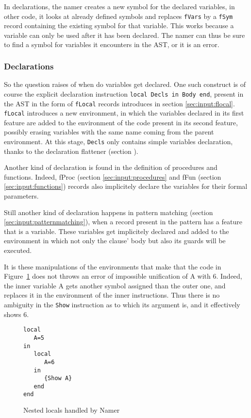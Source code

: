 \documentclass[a4paper]{memoir}
\begin{document}
In declarations, the namer creates a new symbol for the declared variables, in other code, it looks at already defined symbols and replaces \lstinline!fVars! by a \lstinline!fSym! record containing the existing symbol for that variable. This works because a variable can only be used after it has been declared. The namer can thus be sure to find a symbol for variables it encounters in the AST, or it is an error.

\subsubsection{Declarations}
So the question raises of when do variables get declared.
One such construct is of course the explicit declaration instruction \lstinline!local Decls in Body end!, present in the AST in the form of \lstinline!fLocal! records introduces in section \ref{sec:input:flocal}.  \lstinline!fLocal! introduces a new environment, in which the variables declared in its first feature are added to the environment of the code present in its second feature, possibly erasing variables with the same name coming from the parent environment. At this stage, \lstinline!Decls! only contains simple variables declaration, thanks to the declaration flattener (section \label{sec:arch:declsflattener}).

Another kind of declaration is found in the definition of procedures and functions. Indeed, fProc (section \ref{sec:input:procedures} and fFun (section \ref{sec:input:functions}) records also implicitely declare the variables for their formal parameters. %

Still another kind of declaration happens in pattern matching (section \ref{sec:input:patternmatching}), when a record present in the pattern has a feature that is a variable.
These variables get implicitely declared and added to the environment in which not only the clause' body but also its guards will be executed.


It is these manipulations of the environments that make that the code in Figure~\ref{fig:namer_nested_locals} does not throws an error of impossible unification of A with 6. Indeed, the inner variable A gets another symbol assigned than the outer one, and replaces it in the environment of the inner instructions. Thus there is no ambiguity in the \lstinline!Show! instruction as to which its argument is, and it effectively shows 6.
\begin{figure}
\begin{lstlisting}
local
   A=5
in
   local 
      A=6
   in
      {Show A}
   end
end
\end{lstlisting}
\caption{Nested locals handled by Namer}
\label{fig:namer_nested_locals}
\end{figure}
\end{document}
